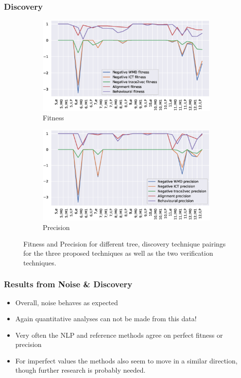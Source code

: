 \documentclass{beamer}
\begin{document}
	
	\begin{frame}
		\frametitle{Discovery}
		\begin{figure}
			\centering
			\begin{subfigure}[b]{0.49\textwidth}
				\centering
				\includegraphics[width=\textwidth]{figures/fitness}
				\caption{Fitness}
				\label{fig:fitness}
			\end{subfigure}
			\hfill
			\begin{subfigure}[b]{0.49\textwidth}
				\centering
				\includegraphics[width=\textwidth]{figures/precision}
				\caption{Precision}
				\label{fig:precision}
			\end{subfigure}
			\caption{Fitness and Precision for different tree, discovery technique pairings for the three proposed techniques as well as the two verification techniques.}
			\label{fig:discovery}
		\end{figure}
	\end{frame}
	
	\begin{frame}
		\frametitle{Results from Noise \& Discovery}
		\begin{itemize}
			\item Overall, noise behaves as expected
			\item Again quantitative analyses can not be made from this data!
			\item Very often the NLP and reference methods agree on perfect fitness or precision
			\item For imperfect values the methods also seem to move in a similar direction, though further research is probably needed.
		\end{itemize}
	\end{frame}
	
\end{document}
